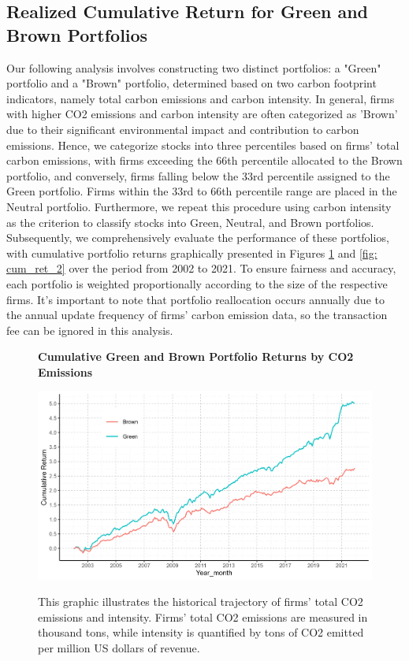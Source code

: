 \documentclass[12pt]{article}
\begin{document}
\subsection{Realized Cumulative Return for Green and Brown Portfolios}

Our following analysis involves constructing two distinct portfolios: a "Green" portfolio and a "Brown" portfolio, determined based on two carbon footprint indicators, namely total carbon emissions and carbon intensity. In general, firms with higher CO2 emissions and carbon intensity are often categorized as 'Brown' due to their significant environmental impact and contribution to carbon emissions. Hence, we categorize stocks into three percentiles based on firms' total carbon emissions, with firms exceeding the 66th percentile allocated to the Brown portfolio, and conversely, firms falling below the 33rd percentile assigned to the Green portfolio. Firms within the 33rd to 66th percentile range are placed in the Neutral portfolio. Furthermore, we repeat this procedure using carbon intensity as the criterion to classify stocks into Green, Neutral, and Brown portfolios. Subsequently, we comprehensively evaluate the performance of these portfolios, with cumulative portfolio returns graphically presented in Figures \ref{fig: cum_ret_1} and \ref{fig: cum_ret_2} over the period from 2002 to 2021. To ensure fairness and accuracy, each portfolio is weighted proportionally according to the size of the respective firms. It's important to note that portfolio reallocation occurs annually due to the annual update frequency of firms' carbon emission data, so the transaction fee can be ignored in this analysis.

\begin{figure}[!ht]
\centering
\caption{\textbf{Cumulative Green and Brown Portfolio Returns by CO2 Emissions}}
\includegraphics{image/green_brown_plot_1.png}
\label{fig: cum_ret_1}
\caption*{\footnotesize{This graphic illustrates the historical trajectory of firms' total CO2 emissions and intensity. Firms' total CO2 emissions are measured in thousand tons, while intensity is quantified by tons of CO2 emitted per million US dollars of revenue.}}
\end{figure}
\end{document}
